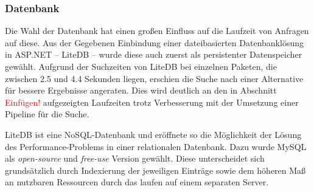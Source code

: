 \subsubsection{Datenbank} \label{sec:ExperimenteDB}
    Die Wahl der Datenbank hat einen großen Einfluss auf die Laufzeit von Anfragen auf diese.
    Aus der Gegebenen Einbindung einer dateibasierten Datenbanklösung in ASP.NET -- LiteDB -- wurde diese auch zuerst als persistenter Datenspeicher gewählt.
    Aufgrund der Suchzeiten von LiteDB bei einzelnen Paketen, die zwischen 2.5 und 4.4 Sekunden liegen, erschien die Suche nach einer Alternative für bessere Ergebnisse angeraten.
    Dies wird deutlich an den in Abschnitt \textcolor{red}{Einfügen!} aufgezeigten Laufzeiten trotz Verbesserung mit der Umsetzung einer Pipeline für die Suche.

    LiteDB ist eine NoSQL-Datenbank und eröffnete so die Möglichkeit der Lösung des Performance-Problems in einer relationalen Datenbank.
    Dazu wurde MySQL als \textit{open-source} und \textit{free-use} Version gewählt.
    Diese unterscheidet sich grundsätzlich durch Indexierung der jeweiligen Einträge sowie dem höheren Maß an nutzbaren Ressourcen durch das laufen auf einem separaten Server.
